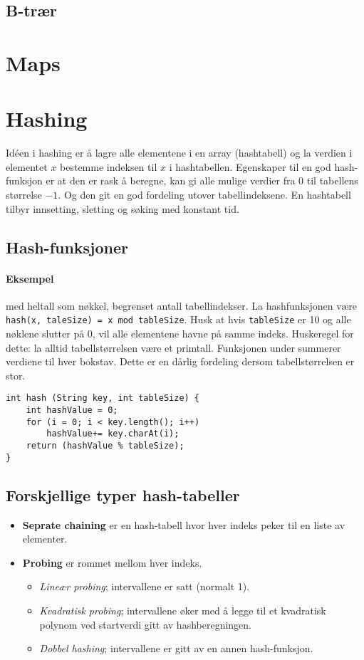 \documentclass[11pt,a4paper]{article}
\theoremstyle{def}
\begin{document}
\subsection{B-trær}


\section{Maps}

\section{Hashing}
Idéen i hashing er å lagre alle elementene i en array (hashtabell) og la verdien i elementet $x$ bestemme indeksen til $x$ i hashtabellen. Egenskaper til en god hash-funksjon er at den er rask å beregne, kan gi alle mulige verdier fra 0 til tabellens størrelse $-1$. Og den git en god fordeling utover tabellindeksene. En hashtabell tilbyr innsetting, sletting og søking med konstant tid.

\subsection{Hash-funksjoner}
\paragraph{Eksempel} med heltall som nøkkel, begrenset antall tabellindekser. La hashfunksjonen være \texttt{hash(x, taleSize) = x mod tableSize}. Husk at hvis \texttt{tableSize} er 10 og alle nøklene slutter på 0, vil alle elementene havne på samme indeks. Huskeregel for dette: la alltid tabellstørrelsen være et primtall. Funksjonen under summerer verdiene til hver bokstav. Dette er en dårlig fordeling dersom tabellstørrelsen er stor.
\begin{lstlisting}
int hash (String key, int tableSize) {
	int hashValue = 0;
	for (i = 0; i < key.length(); i++) 
		hashValue+= key.charAt(i);
	return (hashValue % tableSize);
}
\end{lstlisting}

\subsection{Forskjellige typer hash-tabeller}
\begin{itemize}
\item
\textbf{Seprate chaining} er en hash-tabell hvor hver indeks peker til en liste av elementer.
\item
\textbf{Probing} er rommet mellom hver indeks.
\begin{itemize}
\item
\textit{Lineær probing}; intervallene er satt (normalt 1).
\item
\textit{Kvadratisk probing}; intervallene øker med å legge til et kvadratisk polynom ved startverdi gitt av hashberegningen.
\item
\textit{Dobbel hashing}; intervallene er gitt av en annen hash-funksjon.
\end{itemize}
\end{itemize}
\end{document}
